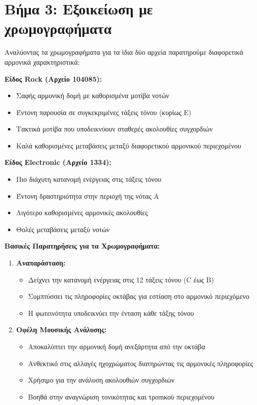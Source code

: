 \documentclass[a4paper,12pt]{article}
\begin{document}
\section*{Βήμα 3: Εξοικείωση με χρωμογραφήματα}

Αναλύοντας τα χρωμογραφήματα για τα ίδια δύο αρχεία παρατηρούμε διαφορετικά αρμονικά χαρακτηριστικά:

\textbf{Είδος Rock (Αρχείο 104085):}
\begin{itemize}
    \item Σαφής αρμονική δομή με καθορισμένα μοτίβα νοτών
    \item Έντονη παρουσία σε συγκεκριμένες τάξεις τόνου (κυρίως E)
    \item Τακτικά μοτίβα που υποδεικνύουν σταθερές ακολουθίες συγχορδιών
    \item Καλά καθορισμένες μεταβάσεις μεταξύ διαφορετικού αρμονικού περιεχομένου
\end{itemize}

\textbf{Είδος Electronic (Αρχείο 1334):}
\begin{itemize}
    \item Πιο διάχυτη κατανομή ενέργειας στις τάξεις τόνου
    \item Έντονη δραστηριότητα στην περιοχή της νότας A
    \item Λιγότερο καθορισμένες αρμονικές ακολουθίες
    \item Θολές μεταβάσεις μεταξύ νοτών
\end{itemize}

\textbf{Βασικές Παρατηρήσεις για τα Χρωμογραφήματα:}
\begin{enumerate}
    \item \textbf{Αναπαράσταση:}
          \begin{itemize}
              \item Δείχνει την κατανομή ενέργειας στις 12 τάξεις τόνου (C έως B)
              \item Συμπτύσσει τις πληροφορίες οκτάβας για εστίαση στο αρμονικό περιεχόμενο
              \item Η φωτεινότητα υποδεικνύει την ένταση κάθε τάξης τόνου
          \end{itemize}

    \item \textbf{Οφέλη Μουσικής Ανάλυσης:}
          \begin{itemize}
              \item Αποκαλύπτει την αρμονική δομή ανεξάρτητα από την οκτάβα
              \item Ανθεκτικό στις αλλαγές ηχοχρώματος διατηρώντας τις αρμονικές πληροφορίες
              \item Χρήσιμο για την ανάλυση ακολουθιών συγχορδιών
              \item Βοηθά στην αναγνώριση τονικότητας και τροπικού περιεχομένου
          \end{itemize}
\end{enumerate}
\end{document}
